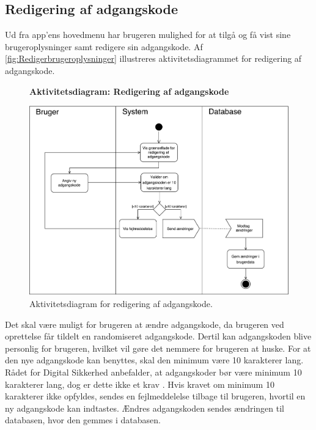 \subsection*{Redigering af adgangskode} \label{sec:redigrering}
Ud fra app'ens hovedmenu har brugeren mulighed for at tilgå og få vist sine brugeroplysninger samt redigere sin adgangskode. Af \autoref{fig:Redigerbrugeroplysninger} illustreres aktivitetsdiagrammet for redigering af adgangskode.  

\begin{figure}[H]
\centering
\textbf{Aktivitetsdiagram: Redigering af adgangskode}\par\medskip
\includegraphics[width=1\textwidth]{figures/aktivitetsdiagram/Redigerbrugeroplysninger}
\caption{Aktivitetsdiagram for redigering af adgangskode.}
\label{fig:Redigerbrugeroplysninger}
\end{figure}

\noindent
Det skal være muligt for brugeren at ændre adgangskode, da brugeren ved oprettelse får tildelt en randomiseret adgangskode. Dertil kan adgangskoden blive personlig for brugeren, hvilket vil gøre det nemmere for brugeren at huske. 
For at den nye adgangskode kan benyttes, skal den minimum være 10 karakterer lang. Rådet for Digital Sikkerhed anbefalder, at adgangskoder bør være minimum 10 karakterer lang, dog er dette ikke et krav \cite{sikkerhed2015}.
Hvis kravet om minimum 10 karakterer ikke opfyldes, sendes en fejlmeddelelse tilbage til brugeren, hvortil en ny adgangskode kan indtastes. 
Ændres adgangskoden sendes ændringen til databasen, hvor den gemmes i databasen.